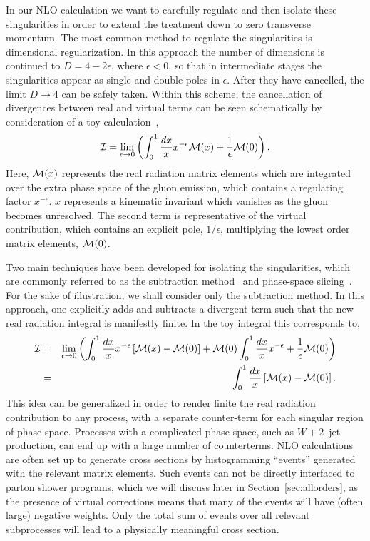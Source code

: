 \documentclass[12pt]{iopart}
\begin{document}
In our NLO calculation we want to carefully regulate and then isolate these
singularities in order to extend the treatment down to zero transverse momentum.
The most common method to regulate the singularities is dimensional
regularization. In this approach the number of dimensions is continued
to $D=4-2\epsilon$, where $\epsilon < 0$, so that in intermediate stages the singularities appear
as single and double poles in $\epsilon$. After they have cancelled, the
limit $D \to 4$ can be safely taken. Within this scheme, the cancellation
of divergences between real and virtual terms can be seen schematically by
consideration of a toy calculation~\cite{Kunszt:1992tn},
\begin{equation}
{\cal I} = \lim_{\epsilon \to 0} \left(
\int_0^1 \frac{dx}{x} x^{-\epsilon} {\cal M}(x)
 + \frac{1}{\epsilon} {\cal M}(0) \right).
\end{equation}
Here, ${\cal M}(x)$ represents the real radiation matrix elements which are
integrated over the extra phase space of the gluon emission,
which contains a regulating factor $x^{-\epsilon}$. $x$ represents
a kinematic invariant which vanishes as the gluon becomes unresolved. The second
term is representative of the virtual contribution, which contains an
explicit pole, $1/\epsilon$, multiplying the lowest order matrix elements,
${\cal M}(0)$.

Two main techniques have been developed for isolating the singularities, which are commonly
referred to as the subtraction
method~\cite{Ellis:1980wv,Frixione:1995ms,Catani:1996vz,Nagy:1996bz}
and phase-space slicing~\cite{Fabricius:1981sx,Giele:1991vf}. For the sake
of illustration, we shall consider only the subtraction method. In this
approach, one explicitly adds and subtracts a divergent term such that
the new real radiation integral is manifestly finite. In the toy integral this
corresponds to,
\begin{eqnarray}
{\cal I} & = & \lim_{\epsilon \to 0} \left(
\int_0^1 \frac{dx}{x} x^{-\epsilon} \left[ {\cal M}(x) - {\cal M}(0) \right]
 +{\cal M}(0) \int_0^1 \frac{dx}{x} x^{-\epsilon}
 + \frac{1}{\epsilon} {\cal M}(0) \right) \nonumber \\
 & = & \int_0^1 \frac{dx}{x} \left[ {\cal M}(x) - {\cal M}(0) \right].
\end{eqnarray}
This idea can be generalized in order to render finite the real radiation contribution to any process, with a
separate counter-term for each singular region of phase space. Processes with a complicated phase space, such as
$W+2$~jet production, can end up with a large number of counterterms. NLO calculations are often set up to generate
cross sections by histogramming ``events'' generated with the relevant matrix  elements. Such events can not be
directly interfaced to parton shower programs, which we will discuss later in Section~\ref{sec:allorders},
as the presence of virtual corrections means that many of the events
will have (often large) negative weights. Only the total sum of events over all relevant subprocesses will lead to
a physically meaningful cross section. 
\end{document}
